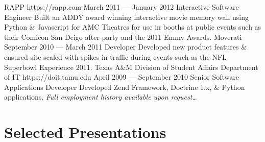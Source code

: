 \documentclass{resume}
\begin{document}
\employer
    {RAPP}
    {https://rapp.com}
    {March 2011 --- January 2012}
    {Interactive Software Engineer}
    {Built an ADDY award winning interactive movie memory wall using Python \& Javascript for AMC Theatres for use in booths at public events such as their Comicon San Deigo after-party and the 2011 Emmy Awards.}
\employer
    {Moverati}
    {}
    {September 2010 --- March 2011}
    {Developer}
    {Developed new product features \& ensured site scaled with spikes in traffic during events such as the NFL Superbowl Experience 2011.}
\employer
    {Texas A\&M Division of Student Affairs Department of IT}
    {https://doit.tamu.edu}
    {April 2009 --- September 2010}
    {Senior Software Applications Developer}
    {Developed Zend Framework, Doctrine 1.x, \& Python applications.}
\emph{Full employment history available upon request\ldots}


\section{Selected Presentations}
\end{document}
